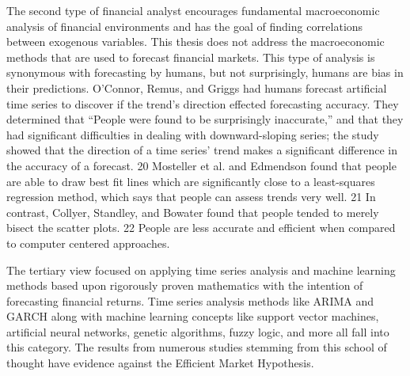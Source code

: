 \documentclass[../main.tex]{subfiles}
\begin{document}
    The second type of financial analyst encourages fundamental macroeconomic analysis of financial environments and has the goal of finding correlations between exogenous variables.
    This thesis does not address the macroeconomic methods that are used to forecast financial markets.
    This type of analysis is synonymous with forecasting by humans, but not surprisingly, humans are bias in their predictions.
    O’Connor, Remus, and Griggs had humans forecast artificial time series to discover if the trend’s direction effected forecasting accuracy.
    They determined that “People were found to be surprisingly inaccurate,” and that they had significant difficulties in dealing with downward-sloping series; the study showed that the direction of a time series’ trend makes a significant difference in the accuracy of a forecast. 20
    Mosteller et al. and Edmendson found that people are able to draw best fit lines which are significantly close to a least-squares regression method, which says that people can assess trends very well. 21
    In contrast, Collyer, Standley, and Bowater found that people tended to merely bisect the scatter plots. 22
    People are less accurate and efficient when compared to computer centered approaches.

    The tertiary view focused on applying time series analysis and machine learning methods based upon rigorously proven mathematics with the intention of forecasting financial returns.
    Time series analysis methods like ARIMA and GARCH along with machine learning concepts like support vector machines, artificial neural networks, genetic algorithms, fuzzy logic, and more all fall into this category.
    The results from numerous studies stemming from this school of thought have evidence against the Efficient Market Hypothesis.
\end{document}
